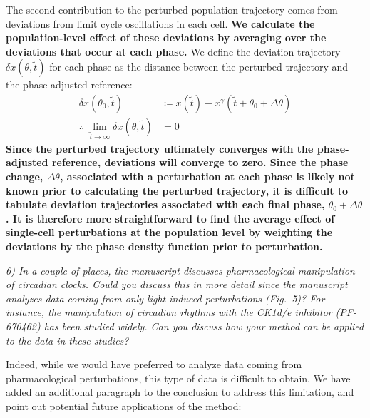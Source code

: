 \documentclass[11pt, letterpaper]{article}
\newenvironment{reviewer}{\itshape\color{gray}}{}
\newenvironment{manuscript}[1]{\begin{center}\begin{tcolorbox}[colback=green!5!white,colframe=green!75!black,width=0.8\textwidth,title={#1},breakable,fonttitle=\bfseries]}{\end{tcolorbox}\end{center}}
\begin{document}
\begin{manuscript}{Pages 12-13}
The second contribution to the perturbed population trajectory comes from deviations from limit cycle oscillations in each cell.
{\bfseries We calculate the population-level effect of these deviations by averaging over the deviations that occur at each phase.}
We define the deviation trajectory $\delta x(\theta, \tilde{t})$ for each phase as the distance between the perturbed trajectory and the phase-adjusted reference:
\begin{align}
  \delta x(\theta_0, \tilde{t}) &\coloneqq x(\tilde{t}) - x^\gamma(\tilde{t} + \theta_0 + \Delta \theta)\tag{48} \\
  \therefore\; \lim_{\tilde{t} \to \infty} \delta x(\theta, \tilde{t}) &= 0 \tag{49}
\end{align}
{\bfseries Since the perturbed trajectory ultimately converges with the phase-adjusted reference, deviations will converge to zero.
Since the phase change, $\Delta\theta$, associated with a perturbation at each phase is likely not known prior to calculating the perturbed trajectory, it is difficult to tabulate deviation trajectories associated with each final phase, $\theta_0 + \Delta\theta$.
It is therefore more straightforward to find the average effect of single-cell perturbations at the population level by weighting the deviations by the phase density function prior to perturbation.}
\end{manuscript}

\begin{reviewer}
6) In a couple of places, the manuscript discusses pharmacological manipulation of circadian clocks.
Could you discuss this in more detail since the manuscript analyzes data coming from only light-induced perturbations (Fig.~5)? 
For instance, the manipulation of circadian rhythms with the CK1d/e inhibitor (PF-670462) has been studied widely.
Can you discuss how your method can be applied to the data in these studies?
\end{reviewer}

Indeed, while we would have preferred to analyze data coming from pharmacological perturbations, this type of data is difficult to obtain.
We have added an additional paragraph to the conclusion to address this limitation, and point out potential future applications of the method:
\end{document}
